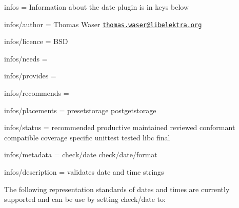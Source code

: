 
\begin{DoxyItemize}
\item infos = Information about the date plugin is in keys below
\item infos/author = Thomas Waser \href{mailto:thomas.waser@libelektra.org}{\tt thomas.\+waser@libelektra.\+org}
\item infos/licence = B\+SD
\item infos/needs =
\item infos/provides =
\item infos/recommends =
\item infos/placements = presetstorage postgetstorage
\item infos/status = recommended productive maintained reviewed conformant compatible coverage specific unittest tested libc final
\item infos/metadata = check/date check/date/format
\item infos/description = validates date and time strings
\end{DoxyItemize}

The following representation standards of dates and times are currently supported and can be use by setting {\ttfamily check/date} to\+:


